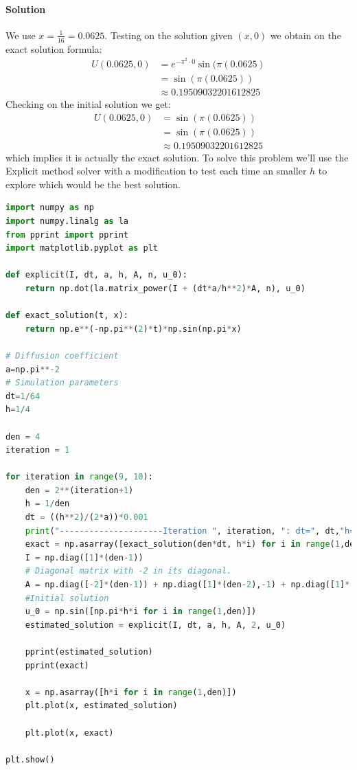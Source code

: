 \documentclass{article}
\begin{document}
\paragraph{Solution} We use $x = \frac{1}{16} = 0.0625$. Testing on the solution given $(x,0)$ we obtain on the exact solution formula:
\begin{align*}
	U(0.0625,0) &= e^{-\pi^2 \cdot 0} \sin{(\pi(0.0625)}\\
	&= \sin{(\pi(0.0625))}\\
	&\approx 0.19509032201612825 
\end{align*}
Checking on the initial solution we get:
\begin{align*}
	U(0.0625,0) &= \sin{(\pi(0.0625))}\\
	&= \sin{(\pi(0.0625))}\\
	&\approx 0.19509032201612825 
\end{align*}
which implies it is actually the exact solution. To solve this problem we'll use the Explicit method solver with a modification to test each time an smaller $h$ to explore which would be the best solution.
\begin{lstlisting}[language=python]
import numpy as np
import numpy.linalg as la
from pprint import pprint
import matplotlib.pyplot as plt

def explicit(I, dt, a, h, A, n, u_0):
	return np.dot(la.matrix_power(I + (dt*a/h**2)*A, n), u_0)

def exact_solution(t, x):
	return np.e**(-np.pi**(2)*t)*np.sin(np.pi*x)

# Diffusion coefficient
a=np.pi**-2
# Simulation parameters
dt=1/64
h=1/4

den = 4
iteration = 1

for iteration in range(9, 10):
	den = 2**(iteration+1)
	h = 1/den
	dt = ((h**2)/(2*a))*0.001
	print("---------------------Iteration ", iteration, ": dt=", dt,"h=1/",den)
	exact = np.asarray([exact_solution(den*dt, h*i) for i in range(1,den)])
	I = np.diag([1]*(den-1))
	# Diagonal matrix with -2 in its diagonal.	
	A = np.diag([-2]*(den-1)) + np.diag([1]*(den-2),-1) + np.diag([1]*(den-2),1)
	#Initial solution
	u_0 = np.sin([np.pi*h*i for i in range(1,den)])
	estimated_solution = explicit(I, dt, a, h, A, 2, u_0)
	
	pprint(estimated_solution)
	pprint(exact)
	
	x = np.asarray([h*i for i in range(1,den)])
	plt.plot(x, estimated_solution)
	
	plt.plot(x, exact)

plt.show()
\end{lstlisting}
\end{document}
